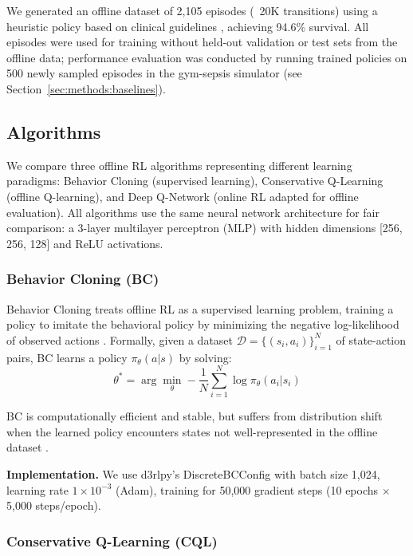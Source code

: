 We generated an offline dataset of 2,105 episodes (~20K transitions) using a heuristic policy based on clinical guidelines \citep{rhodes2017ssc, seymour2017sepsis_criteria}, achieving 94.6\% survival. All episodes were used for training without held-out validation or test sets from the offline data; performance evaluation was conducted by running trained policies on 500 newly sampled episodes in the gym-sepsis simulator (see Section~\ref{sec:methods:baselines}).

\subsection{Algorithms}\label{sec:methods:algos}

We compare three offline RL algorithms representing different learning paradigms: Behavior Cloning (supervised learning), Conservative Q-Learning (offline Q-learning), and Deep Q-Network (online RL adapted for offline evaluation). All algorithms use the same neural network architecture for fair comparison: a 3-layer multilayer perceptron (MLP) with hidden dimensions [256, 256, 128] and ReLU activations.

\subsubsection{Behavior Cloning (BC)}

Behavior Cloning treats offline RL as a supervised learning problem, training a policy to imitate the behavioral policy by minimizing the negative log-likelihood of observed actions \citep{pomerleau1991bc}. Formally, given a dataset $\mathcal{D} = \{(s_i, a_i)\}_{i=1}^N$ of state-action pairs, BC learns a policy $\pi_{\theta}(a|s)$ by solving:
\begin{equation}
\theta^* = \arg\min_{\theta} -\frac{1}{N} \sum_{i=1}^N \log \pi_{\theta}(a_i | s_i)
\end{equation}

BC is computationally efficient and stable, but suffers from distribution shift when the learned policy encounters states not well-represented in the offline dataset \citep{ross2010dagger}.

\textbf{Implementation.} We use d3rlpy's DiscreteBCConfig with batch size 1,024, learning rate $1 \times 10^{-3}$ (Adam), training for 50,000 gradient steps (10 epochs $\times$ 5,000 steps/epoch).

\subsubsection{Conservative Q-Learning (CQL)}

